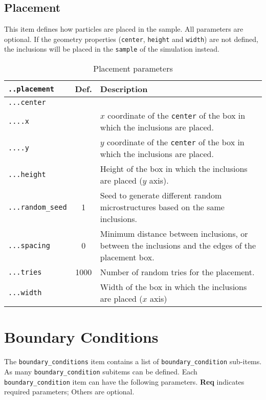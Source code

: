 \documentclass[10pt]{article}
\begin{document}
\subsection{Placement}

This item defines how particles are placed in the sample.
All parameters are optional.
If the geometry properties (\verb+center+, \verb+height+ and \verb+width+) are not defined, the inclusions will be placed in the \verb+sample+ of the simulation instead.

\begin{table}[h!]
\begin{tabularx}{\textwidth}{lcX}
\verb+..placement+ & Def. & Description\\
\hline
\verb+...center+ &  & \\	
\verb+....x+ &  & $x$ coordinate of the \verb+center+ of the box in which the inclusions are placed.\\
\verb+....y+ &  & $y$ coordinate of the \verb+center+ of the box in which the inclusions are placed.\\
\verb+...height+ & & Height of the box in which the inclusions are placed ($y$ axis).\\
\verb+...random_seed+ & 1 & Seed to generate different random microstructures based on the same inclusions.\\
\verb+...spacing+ & 0 & Minimum distance between inclusions, or between the inclusions and the edges of the placement box.\\
\verb+...tries+ & 1000 & Number of random tries for the placement.\\
\verb+...width+ & & Width of the box in which the inclusions are placed ($x$ axis)\\
\hline
\end{tabularx}
\caption{Placement parameters}
\end{table}

\section{Boundary Conditions}

The \verb+boundary_conditions+ item contains a list of \verb+boundary_condition+ sub-items.
As many \verb+boundary_condition+ subitems can be defined.
Each \verb+boundary_condition+ item can have the following parameters.
\textbf{Req} indicates required parameters; Others are optional.

\eject
\end{document}
